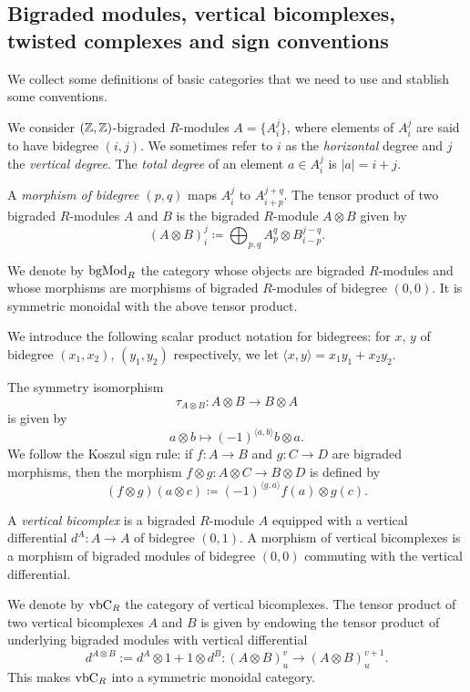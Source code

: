 \documentclass[twoside]{article}
\begin{document}
\subsection{Bigraded modules, vertical bicomplexes, twisted complexes and sign conventions}


We collect some definitions of basic categories that we need to use and stablish some conventions.

\begin{defin}
We consider $(\mathbb{Z},\mathbb{Z})$-bigraded
$R$-modules $A = \{A^j_i\}$, where elements of $A^j_i$ are said to have bidegree $(i, j)$. We sometimes refer to $i$
as the \emph{horizontal} degree and $j$ the \emph{vertical degree}. The \emph{total degree} of an element $a ∈ A^j_i$ is $|a| = i+j$.
\end{defin}
\begin{defin}
A \emph{morphism of bidegree $(p, q)$} maps $A^j_i$ to $A^{j+q}_{i+p}$. The tensor product of two bigraded $R$-modules $A$
and $B$ is the bigraded $R$-module $A ⊗ B$ given by
\[(A ⊗ B)^j_i \coloneqq\bigoplus_{p,q}A^q_p ⊗ B^{j−q}_{i−p} .\]
\end{defin}
We denote by $\mathrm{bgMod}_R$ the category whose objects are bigraded $R$-modules and whose morphisms
are morphisms of bigraded $R$-modules of bidegree $(0, 0)$. It is symmetric monoidal with the above
tensor product.

We introduce the following scalar product notation for bidegrees: for $x$, $y$ of bidegree $(x_1, x_2)$, $(y_1, y_2)$
respectively, we let $\langle x, y\rangle = x_1y_1 + x_2y_2$.

The symmetry isomorphism
\[τ_{A⊗B} : A ⊗ B → B ⊗ A\]
is given by
\[a ⊗ b \mapsto (−1)^{\langle a,b\rangle}b ⊗ a.\]
We follow the Koszul sign rule: if $f : A → B$ and $g : C → D$ are bigraded morphisms, then the
morphism $f ⊗ g : A ⊗ C → B ⊗ D$ is defined by
\[(f ⊗ g)(a ⊗ c) \coloneqq (−1)^{\langle g,a\rangle}f(a) ⊗ g(c).\]

\begin{defin}
A \emph{vertical bicomplex} is a bigraded $R$-module $A$ equipped with a vertical differential $d^A : A → A$ of bidegree $(0, 1)$. A morphism of vertical bicomplexes is a morphism of bigraded modules
of bidegree $(0, 0)$ commuting with the vertical differential.
\end{defin}

We denote by $\mathrm{vbC}_R$ the category of vertical bicomplexes. The tensor product of two vertical bicomplexes $A$ and $B$ is given by endowing the tensor product of underlying bigraded modules with
vertical differential \[d^{A⊗B} := d^A ⊗ 1 + 1 ⊗ d^B : (A ⊗ B)^v_u → (A ⊗ B)^{v+1}_u .\] This makes $\mathrm{vbC}_R$ into a
symmetric monoidal category.
\end{document}
